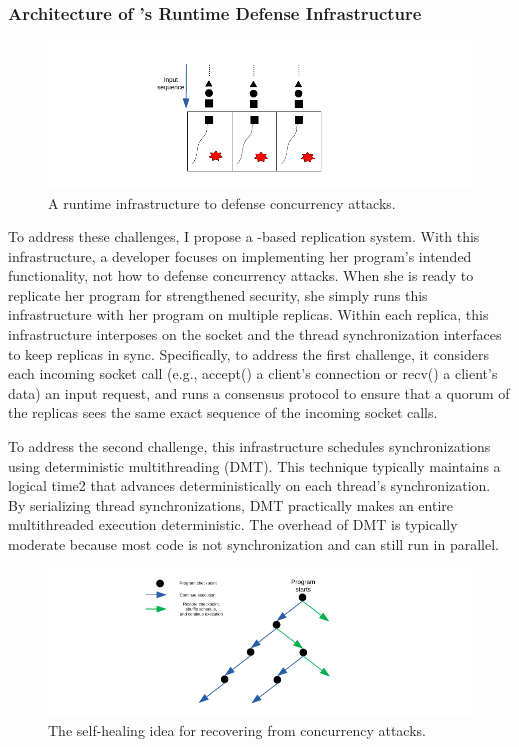 \subsubsection{Architecture of \xxx's Runtime Defense Infrastructure} 
\label{sec:defense-arch}

\begin{figure}[t]
\centering
\includegraphics[width=0.3\columnwidth]{figures/defense}
\vspace{-.05in}
\caption{{A runtime infrastructure to defense concurrency attacks.}} 
\label{fig:defense}
\vspace{-.05in}
\end{figure}

To address these challenges, I propose a \smr-based replication 
system. With this infrastructure, a developer focuses on implementing her 
program’s intended functionality, not how to defense concurrency attacks. When 
she is ready to replicate her program for strengthened security, she simply
runs this infrastructure with her program on multiple replicas. Within
each replica, this infrastructure interposes on the socket and the thread
synchronization interfaces to keep replicas in sync. Specifically, to address 
the first challenge, it considers each incoming socket call (e.g., accept() a 
client’s connection or recv() a client’s data) an input request, and runs a 
\paxos consensus protocol to ensure that a quorum of the replicas sees the same 
exact sequence of the incoming socket calls.

To address the second challenge, this infrastructure schedules synchronizations 
using deterministic multithreading (DMT). This technique
typically maintains a logical time2 that advances deterministically on each 
thread's synchronization. By serializing thread synchronizations, DMT 
practically makes an entire multithreaded execution deterministic. The overhead
of DMT is typically moderate because most code is not synchronization and can 
still run in parallel.

\begin{figure}[t]
\centering
\includegraphics[width=0.3\columnwidth]{figures/healing}
\vspace{-.05in}
\caption{{The self-healing idea for recovering from concurrency attacks.}} 
\label{fig:healing}
\vspace{-.05in}
\end{figure}

